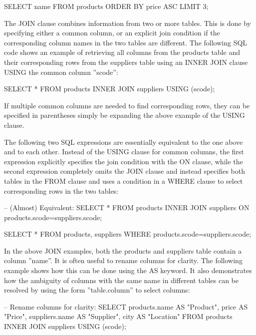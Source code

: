 \begin{sqlcode}
SELECT name FROM products ORDER BY price ASC LIMIT 3;
\end{sqlcode}

The JOIN clause combines information from two or more tables. This is done by specifying either a common column, or an explicit join condition if the corresponding column names in the two tables are different. The following SQL code shows an example of retrieving all columns from the products table and their corresponding rows from the suppliers table using an INNER JOIN clause USING the common column ''scode'':

\begin{sqlcode}
SELECT * FROM products INNER JOIN suppliers USING (scode);
\end{sqlcode}

If multiple common columns are needed to find corresponding rows, they can be specified in parentheses simply be expanding the above example of the USING clause.

The following two SQL expressions are essentially equivalent to the one above and to each other. Instead of the USING clause for common columns, the first expression explicitly specifies the join condition with the ON clause, while the second expression completely omits the JOIN clause and instead specifies both tables in the FROM clause and uses a condition in a WHERE clause to select corresponding rows in the two tables:

\begin{sqlcode}
-- (Almost) Equivalent:
SELECT * FROM products 
    INNER JOIN suppliers ON products.scode=suppliers.scode;

SELECT * FROM products, suppliers 
    WHERE products.scode=suppliers.scode;
\end{sqlcode}

In the above JOIN examples, both the products and suppliers table contain a column ''name''. It is often useful to rename columns for clarity. The following example shows how this can be done using the AS keyword. It also demonstrates how the ambiguity of columns with the same name in different tables can be resolved by using the form ''table.column'' to select columns:

\begin{sqlcode}
-- Rename columns for clarity:
SELECT products.name AS "Product", 
       price AS "Price", 
       suppliers.name AS "Supplier", 
       city AS "Location"
    FROM products INNER JOIN suppliers USING (scode);
\end{sqlcode}

